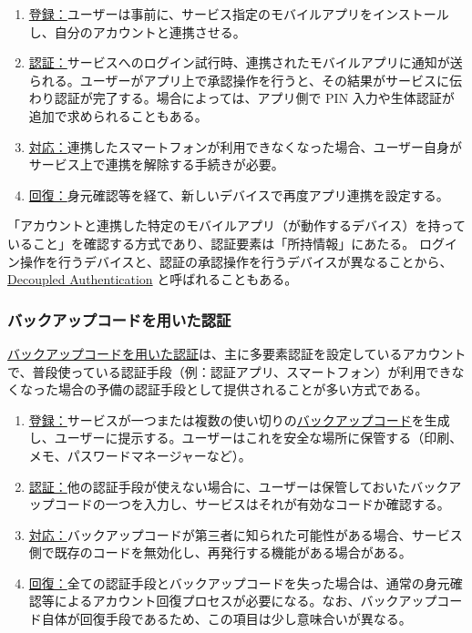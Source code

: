 \documentclass[uplatex]{jsarticle}
\def\label#1{}%
\begin{document}
\begin{enumerate}
\item \underline{登録：}ユーザーは事前に、サービス指定のモバイルアプリをインストールし、自分のアカウントと連携させる。
\item \underline{認証：}サービスへのログイン試行時、連携されたモバイルアプリに通知が送られる。ユーザーがアプリ上で承認操作を行うと、その結果がサービスに伝わり認証が完了する。場合によっては、アプリ側で PIN 入力や生体認証が追加で求められることもある。
\item \underline{対応：}連携したスマートフォンが利用できなくなった場合、ユーザー自身がサービス上で連携を解除する手続きが必要。
\item \underline{回復：}身元確認等を経て、新しいデバイスで再度アプリ連携を設定する。
\end{enumerate}

「アカウントと連携した特定のモバイルアプリ（が動作するデバイス）を持っていること」を確認する方式であり、認証要素は「所持情報」にあたる。
ログイン操作を行うデバイスと、認証の承認操作を行うデバイスが異なることから、\underline{Decoupled Authentication} と呼ばれることもある。

\subsubsection{バックアップコードを用いた認証}

\begin{dfn}[バックアップコードを用いた認証]\label{dfn:backup-code}
\underline{バックアップコードを用いた認証}は、主に多要素認証を設定しているアカウントで、普段使っている認証手段（例：認証アプリ、スマートフォン）が利用できなくなった場合の予備の認証手段として提供されることが多い方式である。
\end{dfn}

\begin{enumerate}
\item \underline{登録：}サービスが一つまたは複数の使い切りの\underline{バックアップコード}を生成し、ユーザーに提示する。ユーザーはこれを安全な場所に保管する（印刷、メモ、パスワードマネージャーなど）。
\item \underline{認証：}他の認証手段が使えない場合に、ユーザーは保管しておいたバックアップコードの一つを入力し、サービスはそれが有効なコードか確認する。
\item \underline{対応：}バックアップコードが第三者に知られた可能性がある場合、サービス側で既存のコードを無効化し、再発行する機能がある場合がある。
\item \underline{回復：}全ての認証手段とバックアップコードを失った場合は、通常の身元確認等によるアカウント回復プロセスが必要になる。なお、バックアップコード自体が回復手段であるため、この項目は少し意味合いが異なる。
\end{enumerate}
\end{document}
